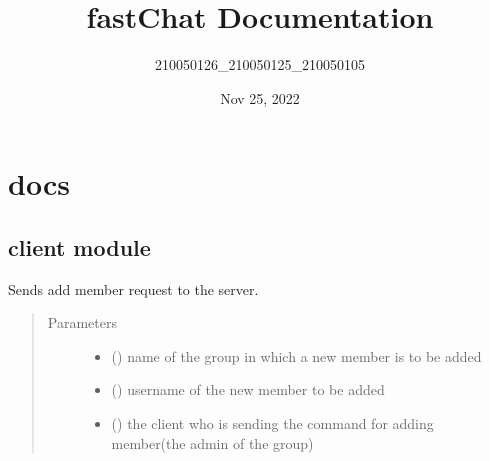 \documentclass[letterpaper,10pt,english]{sphinxmanual}
\title{fastChat Documentation}
\date{Nov 25, 2022}
\author{210050126\_210050125\_210050105}
\begin{document}
\pagestyle{empty}
\sphinxmaketitle
\pagestyle{plain}
\sphinxtableofcontents
\pagestyle{normal}
\label{\detokenize{index::doc}}



\chapter{docs}
\label{\detokenize{modules:docs}}\label{\detokenize{modules::doc}}

\section{client module}
\label{\detokenize{client:module-client}}\label{\detokenize{client:client-module}}\label{\detokenize{client::doc}}

\begin{fulllineitems}
\label{\detokenize{client:client.add_member}}
Sends add member request to the server.
\begin{quote}\begin{description}
\item[{Parameters}] \leavevmode\begin{itemize}
\item {} 
 () \textendash{} name of the group in which a new member is to be added

\item {} 
 () \textendash{} username of the new member to be added

\item {} 
 () \textendash{} the client who is sending the command for adding member(the admin of the group)

\end{itemize}

\end{description}\end{quote}

\end{fulllineitems}
\end{document}
